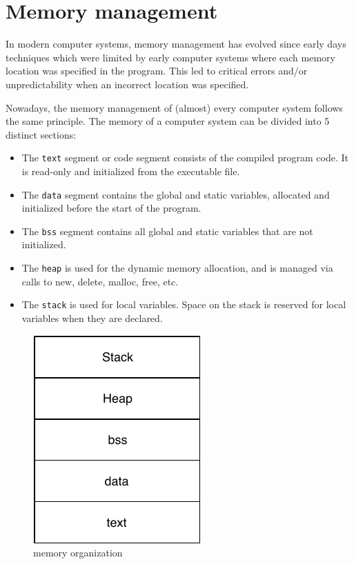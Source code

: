 \section{Memory management}


In modern computer systems, memory management has evolved since early days techniques which were limited
    by early computer systems where each memory location was specified in the program.
This led to critical errors and/or unpredictability when an incorrect location was specified.

Nowadays, the memory management of (almost) every computer system follows the same principle.
The memory of a computer system can be divided into 5 distinct sections\cite{systinfo}:
\begin{itemize}
    \item The \texttt{text} segment or code segment consists of the compiled program code. It is read-only and initialized from the executable file.
    \item The \texttt{data} segment contains the global and static variables, allocated and initialized before the start of the program.
    \item The \texttt{bss} segment contains all global and static variables that are not initialized.
    \item The \texttt{heap} is used for the dynamic memory allocation, and is managed via calls to new, delete, malloc, free, etc.
    \item The \texttt{stack} is used for local variables. Space on the stack is reserved for local variables when they are declared.
\end{itemize}

\begin{figure}[!h]
    \centering
    \includegraphics[]{assets/memory.pdf}
    \caption{\label{fig:kernel-types}memory organization}
\end{figure}

